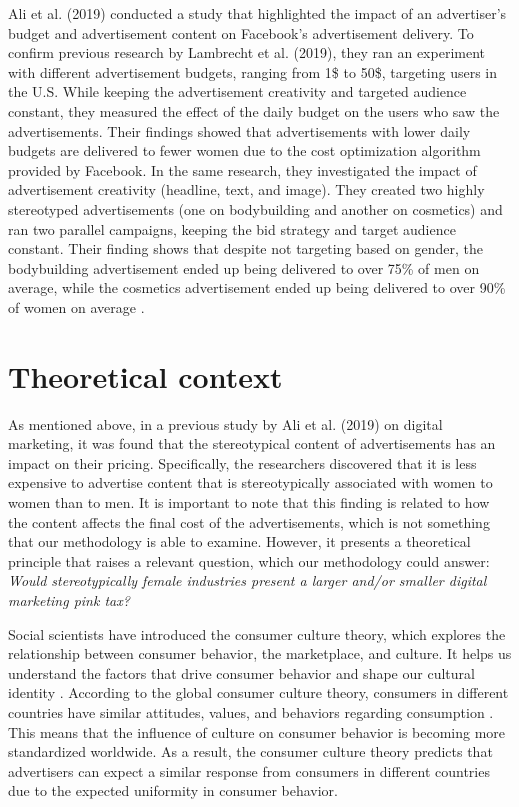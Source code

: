 \documentclass[twocolumn]{bmcart}\usepackage{lineno}
\begin{document}
Ali et al. (2019) conducted a study that highlighted the impact of an advertiser's budget and advertisement content on Facebook's advertisement delivery. To confirm previous research by Lambrecht et al. (2019)\cite{lambrecht2019algorithmic}, they ran an experiment with different advertisement budgets, ranging from 1\$ to 50\$, targeting users in the U.S. While keeping the advertisement creativity and targeted audience constant, they measured the effect of the daily budget on the users who saw the advertisements. Their findings showed that advertisements with lower daily budgets are delivered to fewer women due to the cost optimization algorithm provided by Facebook. In the same research, they investigated the impact of advertisement creativity (headline, text, and image). They created two highly stereotyped advertisements (one on bodybuilding and another on cosmetics) and ran two parallel campaigns, keeping the bid strategy and target audience constant. Their finding shows that despite not targeting based on gender, the bodybuilding advertisement ended up being delivered to over 75\% of men on average, while the cosmetics advertisement ended up being delivered to over 90\% of women on average \cite{ali2019discrimination}. 

\color{black}
\section{Theoretical context}
\color{blue}
As mentioned above, in a previous study by Ali et al. (2019)\cite{ali2019discrimination} on digital marketing, it was found that the stereotypical content of advertisements has an impact on their pricing. Specifically, the researchers discovered that it is less expensive to advertise content that is stereotypically associated with women to women than to men. It is important to note that this finding is related to how the content affects the final cost of the advertisements, which is not something that our methodology is able to examine. However, it presents a theoretical principle that raises a relevant question, which our methodology could answer: \emph{Would stereotypically female industries present a larger and/or smaller digital marketing pink tax?}

Social scientists have introduced the consumer culture theory, which explores the relationship between consumer behavior, the marketplace, and culture. It helps us understand the factors that drive consumer behavior and shape our cultural identity \cite{vinacke1957stereotypes,levitt1983globalization,boddewyn1986standardization}. 
According to the global consumer culture theory, consumers in different countries have similar attitudes, values, and behaviors regarding consumption \cite{em2003perceived}. This means that the influence of culture on consumer behavior is becoming more standardized worldwide. As a result, the consumer culture theory predicts that advertisers can expect a similar response from consumers in different countries due to the expected uniformity in consumer behavior.
\end{document}

